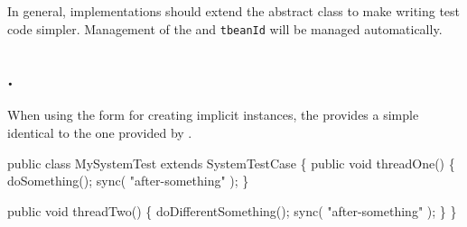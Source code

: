 In general,  implementations should extend the
 abstract class to make
writing test code simpler.  Management of the 
and \texttt{tbeanId} will be managed automatically.

\subsection{.}

When using the  form for creating implicit
 instances, the  provides
a simple  identical to the
one provided by .  

\begin{codelisting}
public class MySystemTest
    extends SystemTestCase
\{
    public void threadOne()
    \{
        doSomething();
        sync( "after-something" );
    \}

    public void threadTwo()
    \{
        doDifferentSomething();
        sync( "after-something" );
    \}
\}
\end{codelisting}
